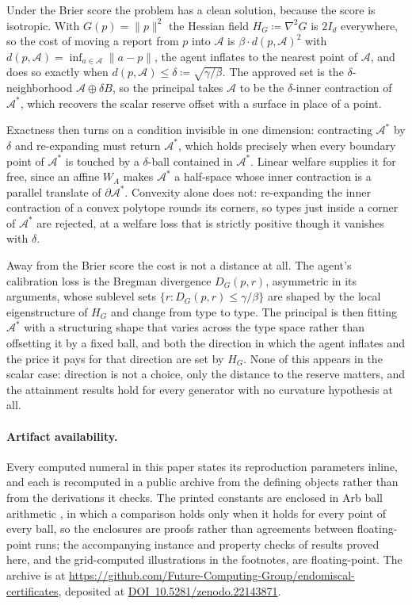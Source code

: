 \documentclass[acmsmall,nonacm,screen]{acmart}
\theoremstyle{acmplain}%
\theoremstyle{acmdefinition}%
\numberwithin{equation}{section}
\begin{document}
\begin{appendix}
Under the Brier score the problem has a clean solution, because the score is isotropic. With $G(p) = \|p\|^2$ the Hessian field $H_G \coloneqq \nabla^2 G$ is $2I_d$ everywhere, so the cost of moving a report from $p$ into $\mathcal{A}$ is $\beta \cdot d(p,\mathcal{A})^2$ with $d(p,\mathcal{A}) = \inf_{a \in \mathcal{A}}\|a-p\|$, the agent inflates to the nearest point of $\mathcal{A}$, and does so exactly when $d(p,\mathcal{A}) \leq \delta \coloneqq \sqrt{\gamma/\beta}$. The approved set is the $\delta$-neighborhood $\mathcal{A} \oplus \delta B$, so the principal takes $\mathcal{A}$ to be the $\delta$-inner contraction of $\mathcal{A}^*$, which recovers the scalar reserve offset with a surface in place of a point.

Exactness then turns on a condition invisible in one dimension: contracting $\mathcal{A}^*$ by $\delta$ and re-expanding must return $\mathcal{A}^*$, which holds precisely when every boundary point of $\mathcal{A}^*$ is touched by a $\delta$-ball contained in $\mathcal{A}^*$. Linear welfare supplies it for free, since an affine $W_A$ makes $\mathcal{A}^*$ a half-space whose inner contraction is a parallel translate of $\partial \mathcal{A}^*$. Convexity alone does not: re-expanding the inner contraction of a convex polytope rounds its corners, so types just inside a corner of $\mathcal{A}^*$ are rejected, at a welfare loss that is strictly positive though it vanishes with $\delta$.

Away from the Brier score the cost is not a distance at all. The agent's calibration loss is the Bregman divergence $D_G(p,r)$, asymmetric in its arguments, whose sublevel sets $\{r : D_G(p,r) \leq \gamma/\beta\}$ are shaped by the local eigenstructure of $H_G$ and change from type to type. The principal is then fitting $\mathcal{A}^*$ with a structuring shape that varies across the type space rather than offsetting it by a fixed ball, and both the direction in which the agent inflates and the price it pays for that direction are set by $H_G$. None of this appears in the scalar case: direction is not a choice, only the distance to the reserve matters, and the attainment results hold for every generator with no curvature hypothesis at all.
\end{appendix}


\paragraph*{Artifact availability.}
Every computed numeral in this paper states its reproduction parameters inline, and each is recomputed in a public archive from the defining objects rather than from the derivations it checks. The printed constants are enclosed in Arb ball arithmetic \citep{johansson2017arb}, in which a comparison holds only when it holds for every point of every ball, so the enclosures are proofs rather than agreements between floating-point runs; the accompanying instance and property checks of results proved here, and the grid-computed illustrations in the footnotes, are floating-point. The archive is at \url{https://github.com/Future-Computing-Group/endomiscal-certificates}, deposited at \href{https://doi.org/10.5281/zenodo.22143871}{DOI~10.5281/zenodo.22143871}.
\end{document}
